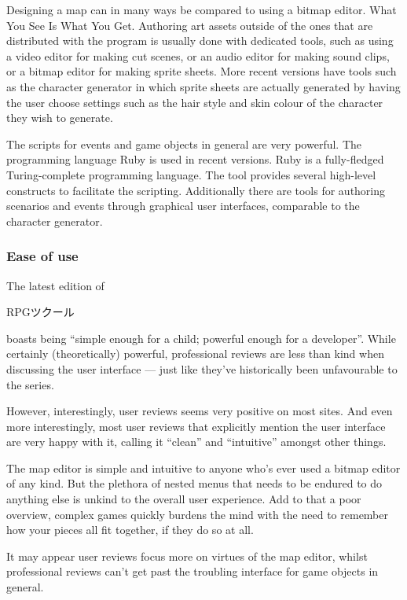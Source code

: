 Designing a map can in many ways be compared to using a bitmap editor. What 
You See Is What You Get. Authoring art assets outside of the ones that are 
distributed with the program is usually done with dedicated tools, such as 
using a video editor for making cut scenes, or an audio editor for making 
sound clips, or a bitmap editor for making sprite sheets. More recent versions 
have tools such as the character generator in which sprite sheets are actually 
generated by having the user choose settings such as the hair style and skin 
colour of the character they wish to generate.

The scripts for events and game objects in general are very powerful. The 
programming language Ruby is used in recent versions. Ruby is a fully-fledged 
Turing-complete programming language. The tool provides several high-level 
constructs to facilitate the scripting. Additionally there are tools for 
authoring scenarios and events through graphical user interfaces, comparable 
to the character generator.

\subsubsection{Ease of use}

The latest edition of \begin{CJK}{UTF8}{min}RPGツクール\end{CJK} boasts being 
``simple enough for a child; powerful enough for a 
developer''\cite{rpgmakervxace}. While certainly (theoretically) powerful, 
professional reviews are less than kind when discussing the user 
interface\cite{johnrpg} --- just like they've historically been unfavourable 
to the series\cite{gamespotrpg}.

However, interestingly, user reviews seems very positive on most 
sites\cite{metacriticrpg, amazonrpg, steamrpg}. And even more interestingly, 
most user reviews that explicitly mention the user interface are very happy 
with it, calling it ``clean'' and ``intuitive'' amongst other things.

The map editor is simple and intuitive to anyone who's ever used a bitmap 
editor of any kind. But the plethora of nested menus that needs to be endured 
to do anything else is unkind to the overall user experience. Add to that a 
poor overview, complex games quickly burdens the mind with the need to 
remember how your pieces all fit together, if they do so at all.

It may appear user reviews focus more on virtues of the map editor, whilst 
professional reviews can't get past the troubling interface for game objects 
in general.

